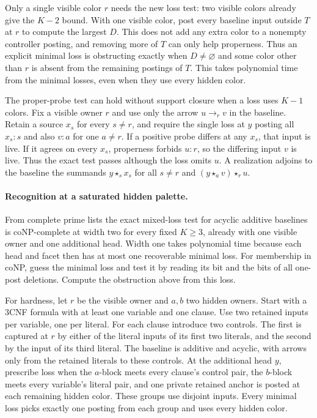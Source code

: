 Only a single visible color $r$ needs the
new loss test: two visible colors already
give the $K-2$ bound. With one visible color,
post every baseline input outside $T$ at
$r$ to compute the largest $D$. This does
not add any extra color to a nonempty
controller posting, and removing more of
$T$ can only help properness. Thus an
explicit minimal loss is obstructing
exactly when $D\ne\varnothing$ and some
color other than $r$ is absent from the
remaining postings of $T$. This takes
polynomial time from the minimal losses,
even when they use every hidden color.

The proper-probe test can hold without support
closure when a loss uses $K-1$ colors. Fix a
visible owner $r$ and use only the arrow
$u\to_r v$ in the baseline. Retain a source
$x_s$ for every $s\ne r$, and require the
single loss at $y$ posting all $x_s:s$ and
also $v:a$ for one $a\ne r$. If a positive
probe differs at any $x_s$, that input is
live. If it agrees on every $x_s$, properness
forbids $u:r$, so the differing input $v$
is live. Thus the exact test passes although
the loss omits $u$. A realization adjoins to
the baseline the summands $y\star_s x_s$
for all $s\ne r$ and
$(y\star_a v)\star_r u$.

\paragraph{Recognition at a saturated hidden palette.}
From complete prime lists the exact mixed-loss
test for acyclic additive baselines is
coNP-complete at width two for every fixed
$K\ge3$, already with one visible owner and
one additional head. Width one takes polynomial
time because each head and facet then has at
most one recoverable minimal loss. For membership
in coNP, guess the minimal loss and test it by
reading its bit and the bits of all one-post
deletions. Compute the obstruction above from
this loss.

For hardness, let $r$ be the visible owner and
$a,b$ two hidden owners. Start with a 3CNF
formula with at least one variable and one clause.
Use two retained inputs per variable, one per
literal. For each clause introduce two controls.
The first is captured at $r$ by either of the
literal inputs of its first two literals, and
the second by the input of its third literal.
The baseline is additive and acyclic, with arrows
only from the retained literals to these controls.
At the additional head $y$, prescribe loss when
the $a$-block meets every clause's control pair,
the $b$-block meets every variable's literal pair,
and one private retained anchor is posted at
each remaining hidden color. These groups use
disjoint inputs. Every minimal loss picks exactly
one posting from each group and uses every hidden
color.

